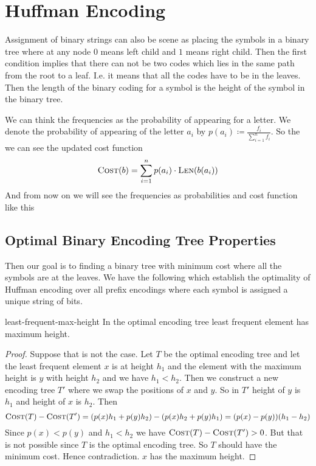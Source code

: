 \section{Huffman Encoding}
\begin{algoprob}
\end{algoprob}

Assignment of binary strings can also be scene as placing the symbols in a binary tree where at any node $0$ means left child and $1$ means right child. Then the first condition implies that there can not be two codes which lies in the same path from the root to a leaf. I.e. it means that all the codes have to be in the leaves. Then the length of the binary coding for a symbol  is the height of the symbol in the binary tree. 

We can think the frequencies as the probability of appearing for a letter. We denote the probability of appearing of the letter $a_i$ by $p(a_i)\coloneqq \frac{f_i}{\sum\limits_{i=1}^nf_i}$. So the we can see the updated cost function $$\textsc{Cost}(b)=\sum\limits_{i=1}^n p(a_i)\cdot\textsc{Len}(b(a_i))$$And from now on we will see the frequencies as probabilities and cost function like this

\subsection{Optimal Binary Encoding Tree Properties}
Then our goal is to finding a binary tree with minimum cost where all the symbols are at the leaves. We have the following which establish the optimality of Huffman encoding over all prefix encodings where each symbol is assigned a unique string of bits.
\begin{lemma}{}{least-frequent-max-height}
	In the optimal encoding tree  least frequent element has maximum height.
\end{lemma}
\begin{proof}
	Suppose that is not the case. Let $T$ be the optimal encoding tree and let the least frequent element $x$ is at height $h_1$ and the element with the maximum height is $y$ with height $h_2$ and we have $h_1<h_2$.  Then we construct a new encoding tree $T'$ where we swap the positions of $x$ and $y$. So in $T'$ height of $y$ is $h_1$ and height of $x$ is $h_2$. Then $$\textsc{Cost}(T)-\textsc{Cost}(T')=(p(x)h_1+p(y)h_2)-(p(x)h_2+p(y)h_1)=(p(x)-p(y))(h_1-h_2)$$Since $p(x)<p(y)$ and $h_1<h_2$ we have $\textsc{Cost}(T)-\textsc{Cost}(T')>0$. But that is not possible since $T$ is the optimal encoding tree. So $T$ should have the minimum cost. Hence contradiction. $x$ has the maximum height.
\end{proof}

